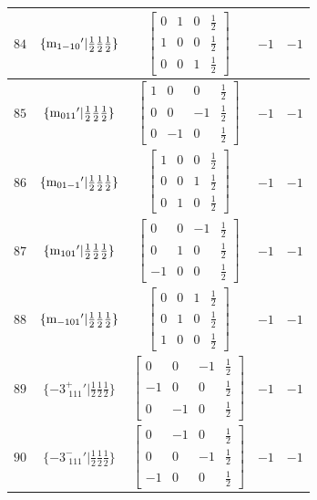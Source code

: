 \documentclass[fleqn,8pt]{jsarticle}
\begin{document}
\begin{longtable}{ccccc}
$ 84 $ & $ \{{\rm m}_{1-10}{}'|\frac{1}{2} \frac{1}{2} \frac{1}{2}\} $ & $ \begin{bmatrix} 0 & 1 & 0 & \frac{1}{2} \\ 1 & 0 & 0 & \frac{1}{2} \\ 0 & 0 & 1 & \frac{1}{2} \end{bmatrix} $ & $ -1 $ & $ -1 $ \\ \hline
$ 85 $ & $ \{{\rm m}_{011}{}'|\frac{1}{2} \frac{1}{2} \frac{1}{2}\} $ & $ \begin{bmatrix} 1 & 0 & 0 & \frac{1}{2} \\ 0 & 0 & -1 & \frac{1}{2} \\ 0 & -1 & 0 & \frac{1}{2} \end{bmatrix} $ & $ -1 $ & $ -1 $ \\ \hline
$ 86 $ & $ \{{\rm m}_{01-1}{}'|\frac{1}{2} \frac{1}{2} \frac{1}{2}\} $ & $ \begin{bmatrix} 1 & 0 & 0 & \frac{1}{2} \\ 0 & 0 & 1 & \frac{1}{2} \\ 0 & 1 & 0 & \frac{1}{2} \end{bmatrix} $ & $ -1 $ & $ -1 $ \\ \hline
$ 87 $ & $ \{{\rm m}_{101}{}'|\frac{1}{2} \frac{1}{2} \frac{1}{2}\} $ & $ \begin{bmatrix} 0 & 0 & -1 & \frac{1}{2} \\ 0 & 1 & 0 & \frac{1}{2} \\ -1 & 0 & 0 & \frac{1}{2} \end{bmatrix} $ & $ -1 $ & $ -1 $ \\ \hline
$ 88 $ & $ \{{\rm m}_{-101}{}'|\frac{1}{2} \frac{1}{2} \frac{1}{2}\} $ & $ \begin{bmatrix} 0 & 0 & 1 & \frac{1}{2} \\ 0 & 1 & 0 & \frac{1}{2} \\ 1 & 0 & 0 & \frac{1}{2} \end{bmatrix} $ & $ -1 $ & $ -1 $ \\ \hline
$ 89 $ & $ \{-3^{+}_{\,\,111}{}'|\frac{1}{2} \frac{1}{2} \frac{1}{2}\} $ & $ \begin{bmatrix} 0 & 0 & -1 & \frac{1}{2} \\ -1 & 0 & 0 & \frac{1}{2} \\ 0 & -1 & 0 & \frac{1}{2} \end{bmatrix} $ & $ -1 $ & $ -1 $ \\ \hline
$ 90 $ & $ \{-3^{-}_{\,\,111}{}'|\frac{1}{2} \frac{1}{2} \frac{1}{2}\} $ & $ \begin{bmatrix} 0 & -1 & 0 & \frac{1}{2} \\ 0 & 0 & -1 & \frac{1}{2} \\ -1 & 0 & 0 & \frac{1}{2} \end{bmatrix} $ & $ -1 $ & $ -1 $ \\ \hline

\end{longtable}
\end{document}
